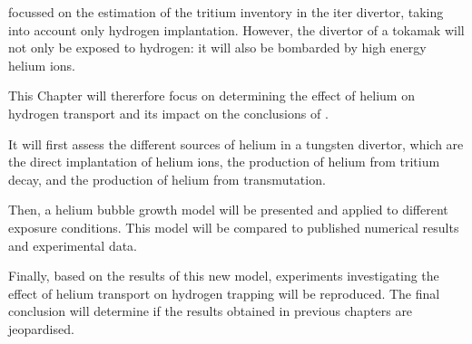  focussed on the estimation of the tritium inventory in the \gls{iter} \gls{divertor}, taking into account only hydrogen implantation.
However, the \gls{divertor} of a \gls{tokamak} will not only be exposed to hydrogen: it will also be bombarded by high energy helium ions.

This Chapter will thererfore focus on determining the effect of helium on hydrogen transport and its impact on the conclusions of .

It will first assess the different sources of helium in a tungsten \gls{divertor}, which are the direct implantation of helium ions, the production of helium from tritium decay, and the production of helium from \gls{transmutation}.

Then, a helium bubble growth model will be presented and applied to different exposure conditions.
This model will be compared to published numerical results and experimental data.

Finally, based on the results of this new model, experiments investigating the effect of helium transport on hydrogen trapping will be reproduced.
The final conclusion will determine if the results obtained in previous chapters are jeopardised.
